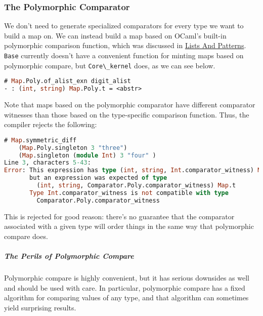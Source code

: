 \hypertarget{the-polymorphic-comparator}{%
\subsubsection{The Polymorphic
Comparator}\label{the-polymorphic-comparator}}

We don't need to generate specialized comparators for every type we want
to build a map on. We can instead build a map based on OCaml's built-in
polymorphic comparison function, which was discussed in
\href{lists-and-patterns.html\#lists-and-patterns}{Lists And Patterns}.
\passthrough{\lstinline!Base!} currently doesn't have a convenient
function for minting maps based on polymorphic compare, but
\passthrough{\lstinline!Core\_kernel!} does, as we can see below.

\begin{lstlisting}[language=Caml]
# Map.Poly.of_alist_exn digit_alist
- : (int, string) Map.Poly.t = <abstr>
\end{lstlisting}

Note that maps based on the polymorphic comparator have different
comparator witnesses than those based on the type-specific comparison
function. Thus, the compiler rejects the following:

\begin{lstlisting}[language=Caml]
# Map.symmetric_diff
    (Map.Poly.singleton 3 "three")
    (Map.singleton (module Int) 3 "four" )
Line 3, characters 5-43:
Error: This expression has type (int, string, Int.comparator_witness) Map.t
       but an expression was expected of type
         (int, string, Comparator.Poly.comparator_witness) Map.t
       Type Int.comparator_witness is not compatible with type
         Comparator.Poly.comparator_witness
\end{lstlisting}

This is rejected for good reason: there's no guarantee that the
comparator associated with a given type will order things in the same
way that polymorphic compare does.

\hypertarget{the-perils-of-polymorphic-compare}{%
\subparagraph{The Perils of Polymorphic
Compare}\label{the-perils-of-polymorphic-compare}}

Polymorphic compare is highly convenient, but it has serious downsides
as well and should be used with care. In particular, polymorphic compare
has a fixed algorithm for comparing values of any type, and that
algorithm can sometimes yield surprising results.

